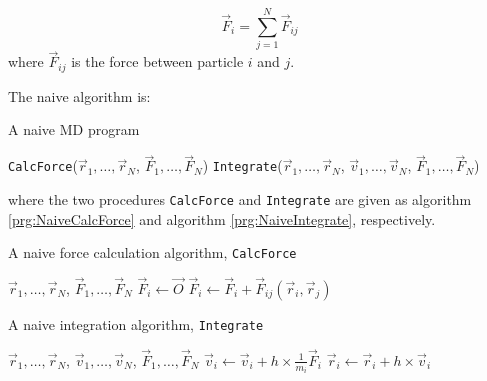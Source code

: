 \begin{equation}
  \vec{F}_i = \sum_{j=1}^{N} \vec{F}_{ij}
\end{equation}
where $\vec{F}_{ij}$ is the force between particle $i$ and $j$. 

The naive algorithm is:

\begin{algorithm}
  \caption[A naive MD program]{A naive MD program}
  \label{prg:NaiveMD}
  \begin{algorithmic}
      \STATE \texttt{CalcForce}($\vec{r}_1, \ldots, \vec{r}_N$, 
             $\vec{F}_1, \ldots, \vec{F}_N$)
      \STATE \texttt{Integrate}($\vec{r}_1, \ldots, \vec{r}_N$, 
             $\vec{v}_1, \ldots, \vec{v}_N$, 
             $\vec{F}_1, \ldots, \vec{F}_N$)
    \ENDFOR
  \end{algorithmic}
\end{algorithm}

where the two procedures \texttt{CalcForce} and \texttt{Integrate} are
given as algorithm \ref{prg:NaiveCalcForce} and algorithm
\ref{prg:NaiveIntegrate}, respectively.

\begin{algorithm}
  \caption[A naive force calculation]{A naive force calculation algorithm, \texttt{CalcForce}}
  \label{prg:NaiveCalcForce}
  \begin{algorithmic}
    \REQUIRE $\vec{r}_1, \ldots, \vec{r}_N$, $\vec{F}_1, \ldots,
    \vec{F}_N$
      \STATE $\vec{F}_i \leftarrow \vec{O}$ 
    \ENDFOR
        \STATE $\vec{F}_i \leftarrow \vec{F}_i +
  \vec{F}_{ij}(\vec{r}_i, \vec{r}_j)$
      \ENDFOR
    \ENDFOR
  \end{algorithmic}
\end{algorithm}


\begin{algorithm}
  \caption[A naive integrator]{A naive integration algorithm, \texttt{Integrate}}
  \label{prg:NaiveIntegrate}
  \begin{algorithmic}
    \REQUIRE $\vec{r}_1, \ldots, \vec{r}_N$, $\vec{v}_1, \ldots,
    \vec{v}_N$, $\vec{F}_1, \ldots, \vec{F}_N$
      \STATE $\vec{v}_i \leftarrow \vec{v}_i +
             h\times\frac{1}{m_i}\vec{F}_i$
      \STATE $\vec{r}_i \leftarrow \vec{r}_i + h\times\vec{v}_i$
    \ENDFOR
  \end{algorithmic} 
\end{algorithm}

